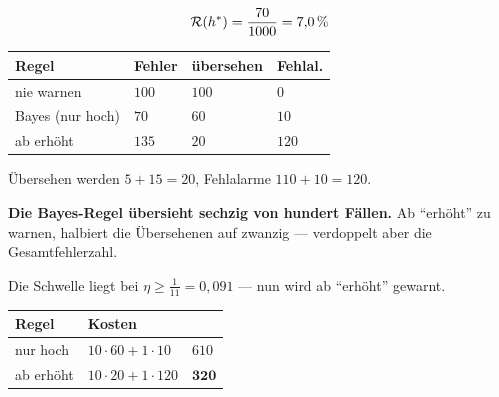 \begin{aufgabe}
\[ \mathcal{R}(h^{*}) = \frac{70}{1000} = 7{,}0\,\% \]

\begin{center}
{\small
\renewcommand{\arraystretch}{1.5}
\begin{tabular}{@{}P{2.6cm}P{1.6cm}P{2.0cm}P{1.6cm}@{}}
\toprule
\textbf{Regel} & \textbf{Fehler} & \textbf{übersehen} & \textbf{Fehlal.}\\
\midrule
nie warnen & $100$ & $100$ & $0$\\
Bayes (nur hoch) & $70$ & $60$ & $10$\\
ab erhöht & $135$ & $20$ & $120$\\
\bottomrule
\end{tabular}}
\end{center}

 Übersehen werden $5+15 = 20$, Fehlalarme $110+10 = 120$.

\begin{center}
\begin{minipage}{0.9\textwidth}
\textbf{Die Bayes-Regel übersieht sechzig von hundert Fällen.} Ab \enquote{erhöht} zu warnen, halbiert die Übersehenen auf zwanzig --- verdoppelt aber die Gesamtfehlerzahl.
\end{minipage}
\end{center}

Die Schwelle liegt bei $\eta \ge \tfrac1{11} = 0{,}091$ --- nun wird ab \enquote{erhöht} gewarnt.
\begin{center}
\renewcommand{\arraystretch}{1.48}
\begin{tabular}{@{}P{2.6cm}P{3.0cm}P{1.8cm}@{}}
\toprule
\textbf{Regel} & \textbf{Kosten} & \\
\midrule
nur hoch & $10\cdot60 + 1\cdot10$ & $610$\\
ab erhöht & $10\cdot20 + 1\cdot120$ & $\mathbf{320}$\\
\bottomrule
\end{tabular}
\end{center}

\begin{center}
\begin{minipage}{0.88\textwidth}
\end{minipage}
\end{center}
\end{aufgabe}

